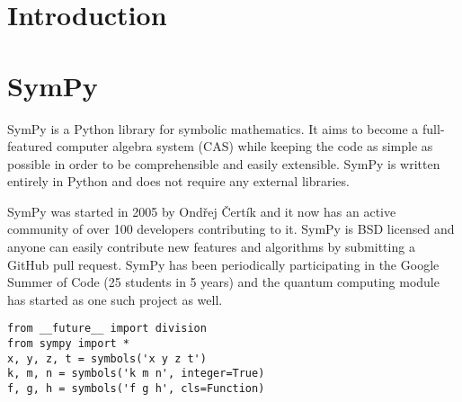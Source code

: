 \documentclass[aps,pra,groupedaddress]{revtex4-1}
\begin{document}
\pacs{}

\maketitle

\section{Introduction}

\section{SymPy}

SymPy \cite{sympy} is a Python library for symbolic mathematics. It aims to become a
full-featured computer algebra system (CAS) while keeping the code as simple as
possible in order to be comprehensible and easily extensible. SymPy is written
entirely in Python and does not require any external libraries.

SymPy was started in 2005 by Ondřej Čertík and it now has an active community
of over 100 developers contributing to it. SymPy is BSD licensed and anyone can
easily contribute new features and algorithms by submitting a GitHub pull
request. SymPy has been periodically participating in the Google Summer of Code
(25 students in 5 years) and the quantum computing module has started as one
such project as well.

\begin{verbatim}
from __future__ import division
from sympy import *
x, y, z, t = symbols('x y z t')
k, m, n = symbols('k m n', integer=True)
f, g, h = symbols('f g h', cls=Function)
\end{verbatim}
\end{document}
